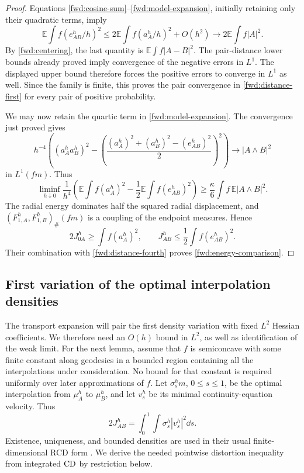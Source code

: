 \begin{proof}
Equations \eqref{fwd:cosine-sum}--\eqref{fwd:model-expansion}, initially
retaining only their quadratic terms, imply
\[
 \mathbb E\int f(e^h_{AB}/h)^2
 \leq 2\mathbb E\int f(a^h_A/h)^2+O(h^2)
 \longrightarrow 2\mathbb E\int f|A|^2.
\]
By \eqref{fwd:centering}, the last quantity is
\(\mathbb E\int f|A-B|^2\). The pair-distance lower bounds already
proved imply convergence of the negative errors in \(L^1\).
The displayed upper bound therefore forces the positive errors to
converge in \(L^1\) as well. Since the family is finite, this proves
the pair convergence in \eqref{fwd:distance-first} for every pair of
positive probability.

We may now retain the quartic term in
\eqref{fwd:model-expansion}. The convergence just proved gives
\[
 h^{-4}\left((a^h_Aa^h_B)^2
 -\left(\frac{(a^h_A)^2+(a^h_B)^2-(e^h_{AB})^2}{2}\right)^2\right)
 \longrightarrow |A\wedge B|^2
\]
in \(L^1(fm)\). Thus
\begin{equation}
\label{fwd:distance-fourth}
 \liminf_{h\downarrow0}\frac1{h^4}
 \left(\mathbb E\int f(a^h_A)^2
       -\frac12\mathbb E\int f(e^h_{AB})^2\right)
 \geq\frac\kappa6\int f\,\mathbb E|A\wedge B|^2.
\end{equation}
The radial energy dominates half the squared radial displacement,
and \((F^h_{1,A},F^h_{1,B})_\#(fm)\) is a coupling of the endpoint
measures. Hence
\[
 2J^h_{0A}\geq\int f(a^h_A)^2,
 \qquad J^h_{AB}\leq\frac12\int f(e^h_{AB})^2.
\]
Their combination with \eqref{fwd:distance-fourth} proves
\eqref{fwd:energy-comparison}.
\end{proof}

\subsection{First variation of the optimal interpolation densities}

The transport expansion will pair the first density variation with
fixed \(L^2\) Hessian coefficients. We therefore need an \(O(h)\)
bound in \(L^2\), as well as identification of the weak limit.
For the next lemma, assume that \(f\) is semiconcave with some finite
constant along geodesics in a bounded region containing all the
interpolations under consideration. No bound for that constant is
required uniformly over later approximations of \(f\).
Let \(\sigma^h_s m\), \(0\leq s\leq1\), be the optimal interpolation
from \(\mu^h_A\) to \(\mu^h_B\), and let \(v^h_s\) be its minimal
continuity-equation velocity. Thus
\[
 2J^h_{AB}=\int_0^1\int\sigma^h_s|v^h_s|^2\dd s.
\]
Existence, uniqueness, and bounded densities are used in their usual
finite-dimensional RCD form
\cite{GigliRajalaSturm2016,Rajala2012}. We derive the needed
pointwise distortion inequality from integrated \(\mathrm{CD}\) by
restriction below.

